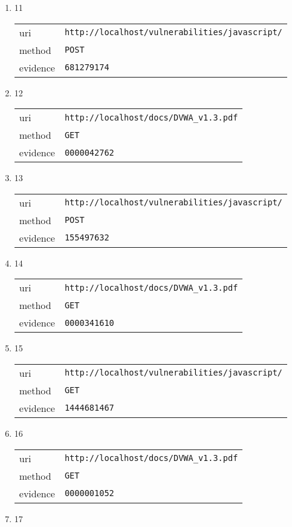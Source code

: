 \documentclass[10pt]{article}
\begin{document}
\begin{itemize}
\begin{enumerate}
\begin{tabular}{| l | p{12cm}}
\end{tabular}
\item[] 11
\begin{tabular}{| l | p{12cm}}
uri & \texttt{http://localhost/vulnerabilities/javascript/} \\
method & \texttt{POST} \\
evidence & \texttt{681279174} \\
\end{tabular}
\item[] 12
\begin{tabular}{| l | p{12cm}}
uri & \texttt{http://localhost/docs/DVWA\_v1.3.pdf} \\
method & \texttt{GET} \\
evidence & \texttt{0000042762} \\
\end{tabular}
\item[] 13
\begin{tabular}{| l | p{12cm}}
uri & \texttt{http://localhost/vulnerabilities/javascript/} \\
method & \texttt{POST} \\
evidence & \texttt{155497632} \\
\end{tabular}
\item[] 14
\begin{tabular}{| l | p{12cm}}
uri & \texttt{http://localhost/docs/DVWA\_v1.3.pdf} \\
method & \texttt{GET} \\
evidence & \texttt{0000341610} \\
\end{tabular}
\item[] 15
\begin{tabular}{| l | p{12cm}}
uri & \texttt{http://localhost/vulnerabilities/javascript/} \\
method & \texttt{GET} \\
evidence & \texttt{1444681467} \\
\end{tabular}
\item[] 16
\begin{tabular}{| l | p{12cm}}
uri & \texttt{http://localhost/docs/DVWA\_v1.3.pdf} \\
method & \texttt{GET} \\
evidence & \texttt{0000001052} \\
\end{tabular}
\item[] 17
\begin{tabular}{| l | p{12cm}}

\end{tabular}
\end{enumerate}
\end{itemize}
\end{document}
